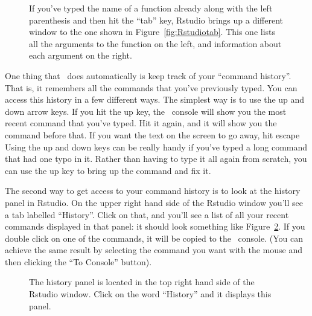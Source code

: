 \begin{figure}[t]
\begin{center}
\caption{If you've typed the name of a function already along with the left parenthesis and then hit the ``tab'' key, Rstudio brings up a different window to the one shown in Figure~\protect\ref{fig:Rstudiotab}. This one lists all the arguments to the function on the left, and information about each argument on the right.}
\HR
\label{fig:Rstudiotab2}
\end{center}
\end{figure}



One thing that \R\ does automatically is keep track of your ``command history''. That is, it remembers all the commands that you've previously typed. You can access this history in a few different ways. The simplest way is to use the up and down arrow keys. If you hit the up key, the \R\ console will show you the most recent command that you've typed. Hit it again, and it will show you the command before that. If you want the text on the screen to go away, hit escape Using the up and down keys can be really handy if you've typed a long command that had one typo in it. Rather than having to type it all again from scratch, you can use the up key to bring up the command and fix it. 

The second way to get access to your command history is to look at the history panel in Rstudio. On the upper right hand side of the Rstudio window you'll see a tab labelled ``History''. Click on that, and you'll see a list of all your recent commands displayed in that panel: it should look something like Figure~\ref{fig:Rstudiohistory}. If you double click on one of the commands, it will be copied to the \R\ console. (You can achieve the same result by selecting the command you want with the mouse and then clicking the ``To Console'' button).

\begin{figure}[t]
\begin{center}
\caption{The history panel is located in the top right hand side of the Rstudio window. Click on the word ``History'' and it displays this panel.  }
\HR
\label{fig:Rstudiohistory}
\end{center}
\end{figure}



